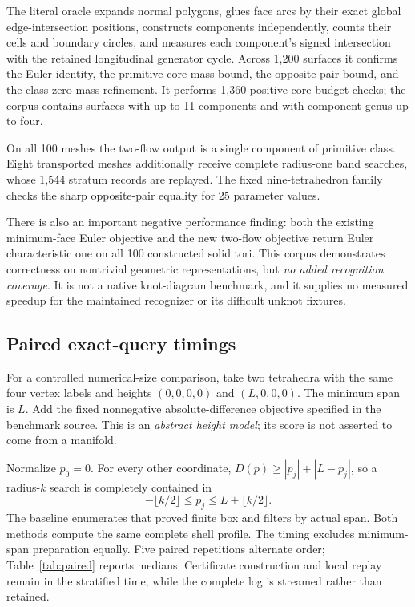 \documentclass[11pt,letterpaper]{article}
\theoremstyle{definition}
\begin{document}
The literal oracle expands normal polygons, glues face arcs by their exact global edge-intersection positions, constructs components independently, counts their cells and boundary circles, and measures each component's signed intersection with the retained longitudinal generator cycle. Across 1,200 surfaces it confirms the Euler identity, the primitive-core mass bound, the opposite-pair bound, and the class-zero mass refinement. It performs 1,360 positive-core budget checks; the corpus contains surfaces with up to 11 components and with component genus up to four.

On all 100 meshes the two-flow output is a single component of primitive class. Eight transported meshes additionally receive complete radius-one band searches, whose 1,544 stratum records are replayed. The fixed nine-tetrahedron family checks the sharp opposite-pair equality for 25 parameter values.

There is also an important negative performance finding: both the existing minimum-face Euler objective and the new two-flow objective return Euler characteristic one on all 100 constructed solid tori. This corpus demonstrates correctness on nontrivial geometric representations, but \emph{no added recognition coverage}. It is not a native knot-diagram benchmark, and it supplies no measured speedup for the maintained recognizer or its difficult unknot fixtures.

\subsection{Paired exact-query timings}
For a controlled numerical-size comparison, take two tetrahedra with the same four vertex labels and heights $(0,0,0,0)$ and $(L,0,0,0)$. The minimum span is $L$. Add the fixed nonnegative absolute-difference objective specified in the benchmark source. This is an \emph{abstract height model}; its score is not asserted to come from a manifold.

Normalize $p_0=0$. For every other coordinate, $D(p)\geq|p_j|+|L-p_j|$, so a radius-$k$ search is completely contained in
\[
 -\lfloor k/2\rfloor\leq p_j\leq L+\lfloor k/2\rfloor.
\]
The baseline enumerates that proved finite box and filters by actual span. Both methods compute the same complete shell profile. The timing excludes minimum-span preparation equally. Five paired repetitions alternate order; Table~\ref{tab:paired} reports medians. Certificate construction and local replay remain in the stratified time, while the complete log is streamed rather than retained.
\end{document}
